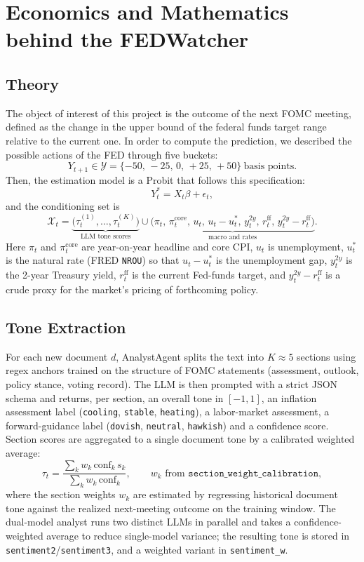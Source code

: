 \section{Economics and Mathematics behind the FEDWatcher}

\subsection{Theory}
The object of interest of this project is the outcome of the next FOMC meeting, defined as the change in the upper bound of the federal funds target range relative to the current one. In order to compute the prediction, we described the possible actions of the FED through five buckets:
\[
  Y_{t+1} \in \mathcal{Y} = \{-50,\,-25,\,0,\,+25,\,+50\}\ \text{basis points}.
\]
Then, the estimation model is a Probit that follows this specification:
\[
  Y^*_t = X_t \beta + \epsilon_t,
\]
and the conditioning set is
\[
  \mathcal{X}_t = \underbrace{\bigl(\tau_t^{(1)}, \ldots, \tau_t^{(K)}\bigr)}_{\text{LLM tone scores}} \cup \underbrace{\bigl(\pi_t,\, \pi_t^{\text{core}},\, u_t,\, u_t - u_t^\ast,\, y_t^{2y},\, r_t^{\text{ff}},\, y_t^{2y} - r_t^{\text{ff}}\bigr)}_{\text{macro and rates}}.
\]
Here $\pi_t$ and $\pi_t^{\text{core}}$ are year-on-year headline and core CPI, $u_t$ is unemployment, $u_t^\ast$ is the natural rate (FRED \texttt{NROU}) so that $u_t - u_t^\ast$ is the unemployment gap, $y_t^{2y}$ is the 2-year Treasury yield, $r_t^{\text{ff}}$ is the current Fed-funds target, and $y_t^{2y} - r_t^{\text{ff}}$ is a crude proxy for the market's pricing of forthcoming policy.

\subsection{Tone Extraction}
For each new document $d$, AnalystAgent splits the text into $K\!\approx\!5$ sections using regex anchors trained on the structure of FOMC statements (assessment, outlook, policy stance, voting record). The LLM is then prompted with a strict JSON schema and returns, per section, an overall tone in $[-1,1]$, an inflation assessment label (\texttt{cooling}, \texttt{stable}, \texttt{heating}), a labor-market assessment, a forward-guidance label (\texttt{dovish}, \texttt{neutral}, \texttt{hawkish}) and a confidence score. Section scores are aggregated to a single document tone by a calibrated weighted average:
\[
  \tau_t = \frac{\sum_k w_k \, \text{conf}_k \, s_k}{\sum_k w_k \, \text{conf}_k}, \qquad w_k \text{ from } \texttt{section\_weight\_calibration},
\]
where the section weights $w_k$ are estimated by regressing historical document tone against the realized next-meeting outcome on the training window. The dual-model analyst runs two distinct LLMs in parallel and takes a confidence-weighted average to reduce single-model variance; the resulting tone is stored in \texttt{sentiment2}/\texttt{sentiment3}, and a weighted variant in \texttt{sentiment\_w}.

